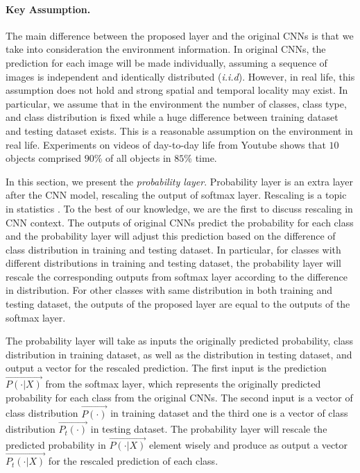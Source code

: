 \documentclass[pageno]{jpaper}
\begin{document}
\paragraph{Key Assumption. } 
The main difference between the proposed layer and the original CNNs is that we take into consideration the environment information. In original CNNs, the prediction for each image will be made individually, assuming a sequence of images is independent and identically distributed (\textit{i.i.d}). However, in real life, this assumption does not hold and strong spatial and temporal locality may exist. In particular, we assume that in the environment the number of classes, class type, and class distribution is fixed while a huge difference between training dataset and testing dataset exists. This is a reasonable assumption on the environment in real life. Experiments on videos of day-to-day life from Youtube \cite{shen2016fast} shows that $10$ objects comprised $90$\% of all objects in $85$\% time. 


In this section, we present the \textit{probability layer}. Probability layer is an extra layer after the CNN model, rescaling the output of softmax layer. Rescaling is a topic in statistics \cite{saerens2002adjusting}. To the best of our knowledge, we are the first to discuss rescaling in CNN context. The outputs of original CNNs predict the probability for each class and the probability layer will adjust this prediction based on the difference of class distribution in training and testing dataset. In particular, for classes with different distributions in training and testing dataset, the probability layer will rescale the corresponding outputs from softmax layer according to the difference in distribution. For other classes with same distribution in both training and testing dataset, the outputs of the proposed layer are equal to the outputs of the softmax layer. 


The probability layer will take as inputs the originally predicted probability, class distribution in training dataset, as well as the distribution in testing dataset, and output a vector for the rescaled prediction. The first input is the prediction $\vec{P(\cdot|X)}$ from the softmax layer, which represents the originally predicted probability for each class from the original CNNs. The second input is a vector of class distribution $\vec{P(\cdot)}$ in training dataset and the third one is a vector of class distribution $\vec{P_t(\cdot)}$ in testing dataset. The probability layer will rescale the predicted probability in $\vec{P(\cdot|X)}$ element wisely and produce as output a vector $\vec{P_t(\cdot|X)}$ for the rescaled prediction of each class.
\end{document}
